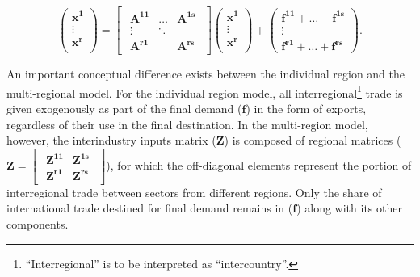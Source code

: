 \documentclass[a4paper,12pt, ]{article}
\begin{document}
\begin{equation} 
\left( \begin{array}{c} 
\mathbf{x^1} \\ 
\vdots\\ 
\mathbf{x^r}\\ 
\end{array} \right) = 
\begin{bmatrix}
\begin{array}{ccc} 
\mathbf{A^{11}} & \ldots & \mathbf{A^{1s}} \\ 
\vdots &  \ddots &  \\ \mathbf{A^{r1}} &  & \mathbf{A^{rs}}
\end{array} 
\end{bmatrix} 
\left( \begin{array}{c} \mathbf{x^1} \\ \vdots\\ \mathbf{x^r}\\ \end{array} \right) + \left(
\begin{array}{c} \mathbf{f^{11}} +  \ldots  +  \mathbf{f^{1s}} \\ \vdots  \\ \mathbf{f^{r1}}  +  \ldots  +  \mathbf{f^{rs}}
\end{array} 
\right) 
\label{07} .
\end{equation}

An important conceptual difference exists between the individual region and the multi-regional model. For the individual region model, all interregional\footnote{``Interregional'' is to be interpreted as ``intercountry''.} trade is given exogenously as part of the final demand ($\mathbf{f}$) in the form of exports, regardless of their use in the final destination. In the multi-region model, however, the interindustry inputs matrix ($\mathbf{Z}$) is composed of regional matrices ($\mathbf{Z}=\begin{bmatrix}
\begin{smallmatrix} \mathbf{Z^{11}}&\mathbf{Z^{1s}}\\ \mathbf{Z^{r1}}&\mathbf{Z^{rs}} \end{smallmatrix} \end{bmatrix}$), for which the off-diagonal elements represent the portion of interregional trade between sectors from different regions. Only the share of international trade destined for final demand remains in ($\mathbf{f}$) along with its other components.
\end{document}
